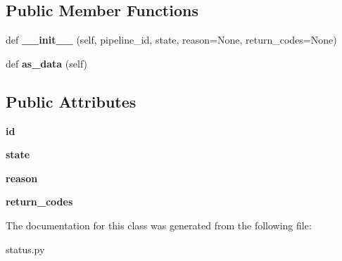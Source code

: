 \subsection*{Public Member Functions}
\begin{DoxyCompactItemize}
\item 
\mbox{\label{classcodar_1_1savanna_1_1status_1_1_pipeline_state_aad524111d3971ff923bbe0fb1846d2e0}} 
def {\bfseries \+\_\+\+\_\+init\+\_\+\+\_\+} (self, pipeline\+\_\+id, state, reason=None, return\+\_\+codes=None)
\item 
\mbox{\label{classcodar_1_1savanna_1_1status_1_1_pipeline_state_a6bc3b110734ec87c57ea209e8e34a1de}} 
def {\bfseries as\+\_\+data} (self)
\end{DoxyCompactItemize}
\subsection*{Public Attributes}
\begin{DoxyCompactItemize}
\item 
\mbox{\label{classcodar_1_1savanna_1_1status_1_1_pipeline_state_a84555aff70ced0a148ecb0b19d9421e3}} 
{\bfseries id}
\item 
\mbox{\label{classcodar_1_1savanna_1_1status_1_1_pipeline_state_a88ffca97c0ff1a0f41874cbeb60b90d3}} 
{\bfseries state}
\item 
\mbox{\label{classcodar_1_1savanna_1_1status_1_1_pipeline_state_ac5a9c042a32b7e3201392bdc680ef42e}} 
{\bfseries reason}
\item 
\mbox{\label{classcodar_1_1savanna_1_1status_1_1_pipeline_state_a5c8ed429b9840e57e11bf69eaa18c9c8}} 
{\bfseries return\+\_\+codes}
\end{DoxyCompactItemize}


The documentation for this class was generated from the following file\+:\begin{DoxyCompactItemize}
\item 
status.\+py\end{DoxyCompactItemize}
